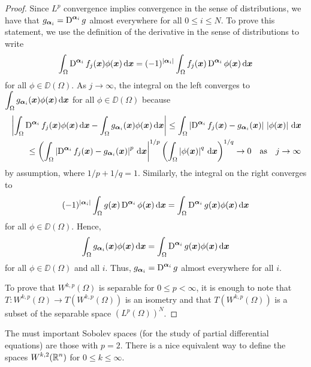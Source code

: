\begin{proof}
Since $\displaystyle L^p$ convergence implies convergence in the
sense of distributions, we have that
$\displaystyle g_{{\bm{\alpha}}_i} = \operatorname{D}^{{\bm{\alpha}}_i} g$ almost
everywhere for all $0\leq i \leq N$.  To prove this statement, we use
the definition of the derivative in the sense of distributions to write
\[
\int_\Omega \operatorname{D}^{{\bm{\alpha}}_i} f_j({\bm{x}}) \phi({\bm{x}}) \,\mathrm{d}{{\bm{x}}} =
(-1)^{|{\bm{\alpha}}_i|} \int_\Omega f_j({\bm{x}})
\operatorname{D}^{{\bm{\alpha}}_i} \phi({\bm{x}}) \,\mathrm{d}{{\bm{x}}}
\]
for all $\phi \in \DD(\Omega)$.  As $j\rightarrow \infty$, the
integral on the left converges to
$\displaystyle \int_\Omega g_{{\bm{\alpha}}_i}({\bm{x}}) \phi({\bm{x}}) \,\mathrm{d}{{\bm{x}}}$
for all $\phi\in \DD(\Omega)$ because
\begin{align*}
&\left| \int_\Omega \operatorname{D}^{{\bm{\alpha}}_i} f_j({\bm{x}}) \phi({\bm{x}}) \,\mathrm{d}{{\bm{x}}}
- \int_\Omega g_{{\bm{\alpha}}_i}({\bm{x}}) \phi({\bm{x}}) \,\mathrm{d}{{\bm{x}}} \right|
\leq \int_\Omega \left| \operatorname{D}^{{\bm{\alpha}}_i}
f_j({\bm{x}}) - g_{{\bm{\alpha}}_i}({\bm{x}})
\right| \, \left| \phi({\bm{x}}) \right| \,\mathrm{d}{{\bm{x}}} \\
&\qquad \leq
\left(\int_\Omega \left| \operatorname{D}^{{\bm{\alpha}}_i} f_j({\bm{x}})
- g_{{\bm{\alpha}}_i}({\bm{x}}) \right|^p \,\mathrm{d}{{\bm{x}}} \right|^{1/p}
\left( \int_\Omega \left| \phi({\bm{x}}) \right|^q \,\mathrm{d}{{\bm{x}}} \right)^{1/q}
\to 0 \quad \text{as} \quad j \to \infty
\end{align*}
by assumption, where $1/p + 1/q = 1$.  Similarly,
the integral on the right converges to
\[
(-1)^{|{\bm{\alpha}}_i|} \int_\Omega g({\bm{x}}) \operatorname{D}^{{\bm{\alpha}}_i} \phi({\bm{x}})
\,\mathrm{d}{{\bm{x}}} = \int_\Omega \operatorname{D}^{{\bm{\alpha}}_i} g({\bm{x}}) \phi({\bm{x}})
\,\mathrm{d}{{\bm{x}}}
\]
for all $\phi\in \DD(\Omega)$.  Hence,
\[
 \int_\Omega g_{{\bm{\alpha}}_i}({\bm{x}}) \phi({\bm{x}}) \,\mathrm{d}{{\bm{x}}}
= \int_\Omega \operatorname{D}^{{\bm{\alpha}}_i} g({\bm{x}}) \phi({\bm{x}}) \,\mathrm{d}{{\bm{x}}}
\]
for all $\phi\in \DD(\Omega)$ and all $i$.  Thus,
$\displaystyle g_{{\bm{\alpha}}_i} = \operatorname{D}^{{\bm{\alpha}}_i} g$ almost
everywhere for all $i$.

 To prove that $\displaystyle W^{k,p}(\Omega)$ is separable for
$0\leq p < \infty$, it is enough to note that
$\displaystyle T : W^{k,p}(\Omega) \rightarrow T\left(W^{k,p}(\Omega)\right)$ is
an isometry and that $\displaystyle T\left(W^{k,p}(\Omega)\right)$ is
a subset of the separable space $\displaystyle (L^p(\Omega))^N$.
\end{proof}

The must important Sobolev spaces (for the study of partial
differential equations) are those with $p=2$.  There is a nice
equivalent way to define the spaces
$\displaystyle W^{k,2}(\mathbb{R}^n)$ for $0\leq k \leq \infty$.

